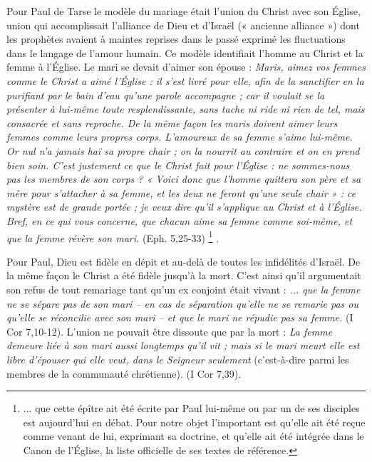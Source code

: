  Pour Paul de Tarse le modèle du mariage était l'union du Christ avec son Église, union qui accomplissait l'alliance de Dieu et d'Israël (« ancienne alliance ») dont les prophètes avaient à maintes reprises dans le passé exprimé les fluctuations dans le langage de l'amour humain. Ce modèle identifiait l'homme au Christ et la femme à l'Église. Le mari se devait d'aimer son épouse : \emph{Maris, aimez vos femmes comme le Christ a aimé l'Église : il s'est livré pour elle, afin de la sanctifier en la purifiant par le bain d'eau qu'une parole accompagne ; car il voulait se la présenter à lui-même toute resplendissante, sans tache ni ride ni rien de tel, mais consacrée et sans reproche. De la même façon les maris doivent aimer leurs femmes comme leurs propres corps. L'amoureux de sa femme s'aime lui-même. Or nul n'a jamais haï sa propre chair ; on la nourrit au contraire et on en prend bien soin. C'est justement ce que le Christ fait pour l'Église : ne sommes-nous pas les membres de son corps ? « Voici donc que l'homme quittera son père et sa mère pour s'attacher à sa femme, et les deux ne feront qu'une seule chair » : ce mystère est de grande portée ; je veux dire qu'il s'applique au Christ et à l'Église. Bref, en ce qui vous concerne, que chacun aime sa femme comme soi-même, et que la femme révère son mari.} (Eph. 5,25-33)%
\footnote{... que cette épître ait été écrite par Paul lui-même ou par un de ses disciples est aujourd'hui en débat. Pour notre objet l'important est qu'elle ait été reçue comme venant de lui, exprimant sa doctrine, et qu'elle ait été intégrée dans le Canon de l'Église, la liste officielle de ses textes de référence.}%
. 

 Pour Paul, Dieu est fidèle en dépit et au-delà de toutes les infidélités d'Israël. De la même façon le Christ a été fidèle jusqu'à la mort. C'est ainsi qu'il argumentait son refus de tout remariage tant qu'un ex conjoint était vivant : \emph{... que la femme ne se sépare pas de son mari -- en cas de séparation qu'elle ne se remarie pas ou qu'elle se réconcilie avec son mari -- et que le mari ne répudie pas sa femme.} (I Cor 7,10-12). L'union ne pouvait être dissoute que par la mort : \emph{La femme demeure liée à son mari aussi longtemps qu'il vit ; mais si le mari meurt elle est libre d'épouser qui elle veut, dans le Seigneur seulement} (c'est-à-dire parmi les membres de la communauté chrétienne). (I Cor 7,39). 
 
